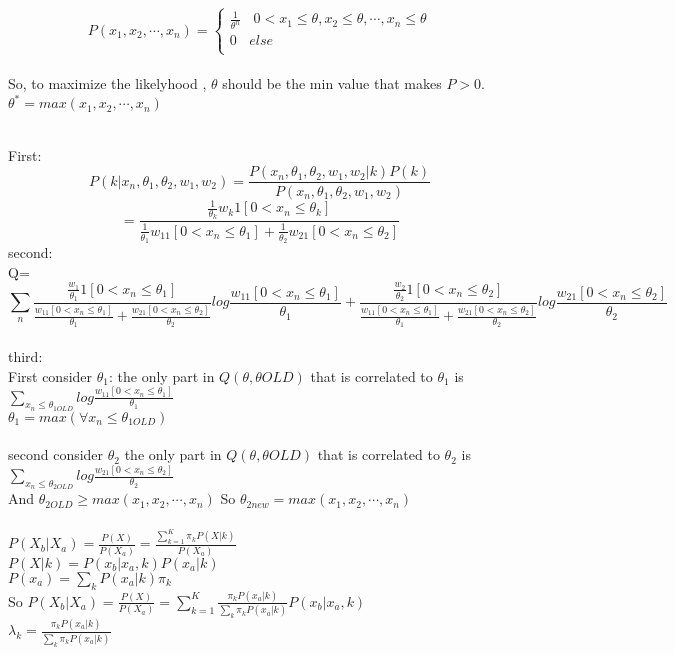 \documentclass[11pt]{article}
\begin{document}
\\
	  \begin{equation}
		P(x_1,x_2,\cdots,x_n)=
       \begin{cases}
		\frac{1}{\theta^n}\ \ \ \ 0<x_1\leq\theta, x_2\leq\theta,\cdots,x_n\leq\theta \\
		0\ \ \ \ else\\
	\end{cases}
	\end{equation}\\
	So, to maximize the likelyhood , $\theta$ should be the min value that makes $P>0$.\\
	$\theta^*=max(x_1,x_2,\cdots,x_n)$



\\
	First:
	$$P(k|x_n,\theta_1,\theta_2,w_1,w_2)=\frac{P(x_n,\theta_1,\theta_2,w_1,w_2|k)P(k)}{P(x_n,\theta_1,\theta_2,w_1,w_2)}$$
	$$=\frac{\frac{1}{\theta_k}w_k1[0<x_n\le\theta_k]}{\frac{1}{\theta_1}w_11[0<x_n\le\theta_1]+\frac{1}{\theta_2}w_21[0<x_n\le\theta_2]}$$
	second:\\
	Q=\begin{equation}
		\sum_{n}{\frac{\frac{w_1}{\theta_1}1[0<x_n\leq\theta_1]}{\frac{w_11[0<x_n\leq\theta_1]}{\theta_1}+\frac{w_21[0<x_n\leq\theta_2]}{\theta_2}}log{\frac{w_11[0<x_n\leq\theta_1]}{\theta_1}}
+\frac{\frac{w_2}{\theta_2}1[0<x_n\leq\theta_2]}{\frac{w_11[0<x_n\leq\theta_1]}{\theta_1}+\frac{w_21[0<x_n\leq\theta_2]}{\theta_2}}log{\frac{w_21[0<x_n\leq\theta_2]}{\theta_2}}}
	\end{equation}\\

third:\\
	First consider $\theta_1$:
	the only part in $Q(\theta,\theta OLD)$ that is correlated to $\theta_1$ is $\sum_{x_n\leq\theta_{1OLD}}{log{\frac{w_11[0<x_n\leq\theta_1]}{\theta_1}}}$\\
	$\theta_1=max(\forall x_n\leq\theta_{1OLD})$\\\\
	
	second consider $\theta_2$
	the only part in $Q(\theta,\theta OLD)$ that is correlated to $\theta_2$ is $\sum_{x_n\leq\theta_{2OLD}}{log{\frac{w_21[0<x_n\leq\theta_2]}{\theta_2}}}$\\
	And $\theta_{2OLD}\geq max(x_1,x_2,\cdots,x_n)$
	So $\theta_{2new}=max(x_1,x_2,\cdots,x_n)$\\
	

\\
		$P(X_b|X_a)=\frac{P(X)}{P(X_a)}=\frac{\sum_{k=1}^{K}{\pi_kP(X|k)}}{P(X_a)}$\\
		$P(X|k)=P(x_b|x_a,k)P(x_a|k)$\\
		$P(x_a)=\sum_{k}{P(x_a|k) \pi_k}$\\
		So $P(X_b|X_a)=\frac{P(X)}{P(X_a)}=\sum_{k=1}^{K}{\frac{\pi_kP(x_a|k)}{\sum_{k}{\pi_kP(x_a|k) }}P(x_b|x_a,k)}$\\
		$\lambda_k=\frac{\pi_kP(x_a|k)}{\sum_{k}{\pi_kP(x_a|k) }}$\\ \\ \\
\end{document}
